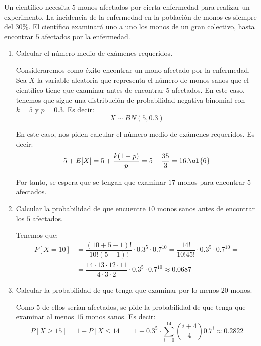 \begin{ejercicio}
    Un científico necesita $5$ monos afectados por cierta enfermedad para realizar un experimento. La
    incidencia de la enfermedad en la población de monos es siempre del $30\%$. El científico examinará
    uno a uno los monos de un gran colectivo, hasta encontrar $5$ afectados por la enfermedad.
    \begin{enumerate}
        \item Calcular el número medio de exámenes requeridos.
        
        Consideraremos como éxito encontrar un mono afectado por la enfermedad. Sea $X$ la variable aleatoria que representa el número de monos sanos que el científico tiene que examinar antes de encontrar $5$ afectados. En este caso, tenemos que sigue una distribución de probabilidad negativa binomial con $k=5$ y $p=0.3$. Es decir:
        \begin{equation*}
            X \sim BN(5,0.3)
        \end{equation*}

        En este caso, nos piden calcular el número medio de exámenes requeridos. Es decir:
        \begin{equation*}
            5 + E[X] = 5 + \dfrac{k(1-p)}{p} = 5 + \dfrac{35}{3} = 16.\ol{6}
        \end{equation*}

        Por tanto, se espera que se tengan que examinar $17$ monos para encontrar $5$ afectados.
        \item Calcular la probabilidad de que encuentre $10$ monos sanos antes de encontrar los $5$ afectados.
        
        Tenemos que:
        \begin{align*}
            P[X=10] &= \dfrac{(10+5-1)!}{10!(5-1)!}\cdot 0.3^5 \cdot 0.7^{10} = \dfrac{14!}{10!45!} \cdot 0.3^5 \cdot 0.7^{10}
            =\\&= \dfrac{14\cdot 13\cdot 12\cdot 11}{4\cdot 3\cdot 2} \cdot 0.3^5 \cdot 0.7^{10} \approx 0.0687
        \end{align*}
        
        \item Calcular la probabilidad de que tenga que examinar por lo menos $20$ monos.
        
        Como $5$ de ellos serían afectados, se pide la probabilidad de que tenga que examinar al menos $15$ monos sanos. Es decir:
        \begin{equation*}
            P[X\geq 15] = 1 - P[X\leq 14] = 1 - 0.3^5 \cdot \sum_{i=0}^{14} \binom{i+4}{4} 0.7^i \approx 0.2822
        \end{equation*}
    \end{enumerate}
\end{ejercicio}

